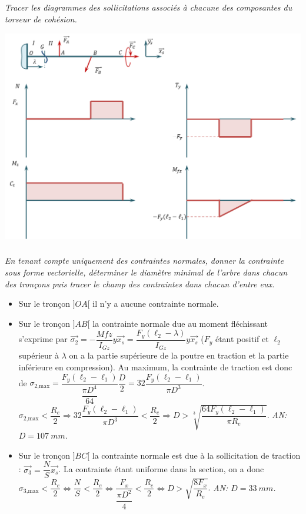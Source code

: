 \documentclass[10pt,fleqn]{article} %
\begin{document}
\begin{multicols}{2}
\subparagraph{}\textit{Tracer les diagrammes des sollicitations associés à chacune des composantes du torseur de cohésion.}
\begin{center}
\includegraphics[width=.95\linewidth]{images/corr_02}
\end{center}

\subparagraph{}\textit{En tenant compte uniquement des contraintes normales, donner la contrainte sous forme vectorielle, déterminer le diamètre minimal de l'arbre dans chacun
des tronçons puis tracer le champ des contraintes dans chacun d'entre eux.}

\begin{itemize}
\item Sur le tronçon $]OA[$ il n'y a aucune contrainte normale. 
\item Sur le tronçon $]AB[$ la contrainte normale due au moment fléchissant s'exprime par  $\overrightarrow{\sigma_2}= -\dfrac{Mfz}{I_{Gz}}y \overrightarrow{x_s}= \dfrac{F_y\left( \ell_2 - \lambda \right)}{I_{Gz}}y \overrightarrow{x_s} $ ($F_y$ étant positif et $\ell_2$ supérieur à $\lambda$ on a la partie supérieure de la poutre en traction et la partie inférieure en compression). Au maximum, la contrainte de traction est donc de $\sigma_{\text{2,max}}=\dfrac{F_y\left( \ell_2 - \ell_1 \right)}{\dfrac{\pi D^4}{64}}\dfrac{D}{2}=32\dfrac{F_y\left( \ell_2 - \ell_1 \right)}{\pi D^3}$. $\sigma_{\text{2,max}} < \dfrac{R_e}{2} \Rightarrow 32\dfrac{F_y\left( \ell_2 - \ell_1 \right)}{\pi D^3} < \dfrac{R_e}{2} \Rightarrow D > \sqrt[3]{\dfrac{64 F_y\left( \ell_2 - \ell_1 \right)}{\pi R_e}}$. \textit{AN: $D= \SI{107}{mm}$.}
\item Sur le tronçon $]BC[$ la contrainte normale est due à la sollicitation de traction : $\overrightarrow{\sigma_{\text{3}}} = \dfrac{N}{S}\overrightarrow{x_s}$. La contrainte étant uniforme dans la section, on a donc 
$\sigma_{\text{3,max}} < \dfrac{R_e}{2} \Leftrightarrow \dfrac{N}{S} < \dfrac{R_e}{2} \Leftrightarrow \dfrac{F_x}{\dfrac{\pi D^2 }{4}} < \dfrac{R_e}{2}
\Leftrightarrow  D > \sqrt{\dfrac{8 F_x}{R_e}} $. \textit{AN: $D= \SI{33}{mm}$.}
\end{itemize}


\end{multicols}
\end{document}
